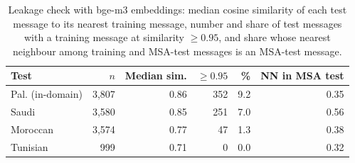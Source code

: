 \begin{table}[t]\centering\small\caption{Leakage check with bge-m3 embeddings: median cosine similarity of each test message to its nearest training message, number and share of test messages with a training message at similarity $\geq 0.95$, and share whose nearest neighbour among training and MSA-test messages is an MSA-test message.}\label{tab:leak}
\begin{tabular}{lrrrrr}\toprule
Test & $n$ & Median sim. & $\geq 0.95$ & \% & NN in MSA test \\\midrule
Pal. (in-domain) & 3{,}807 & 0.86 & 352 & 9.2 & 0.35 \\
Saudi & 3{,}580 & 0.85 & 251 & 7.0 & 0.56 \\
Moroccan & 3{,}574 & 0.77 & 47 & 1.3 & 0.38 \\
Tunisian & 999 & 0.71 & 0 & 0.0 & 0.32 \\
\bottomrule\end{tabular}\end{table}
